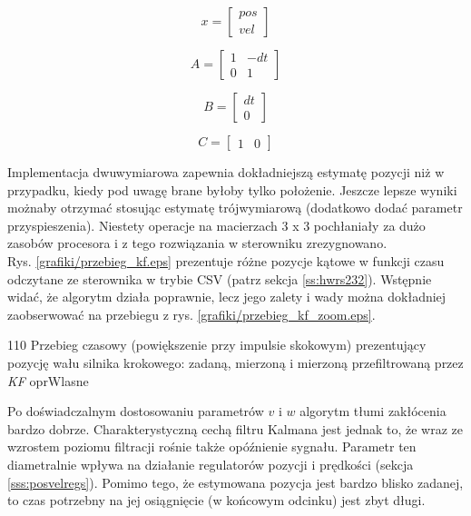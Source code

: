 \begin{equation} \label{eq:alg6}
	x = \begin{bmatrix}
       	pos \\ 
       	vel
     	\end{bmatrix}
\end{equation}

\begin{equation} \label{eq:alg7}
	A = \begin{bmatrix}
       	1 & -dt \\ 
       	0 & 1
     	\end{bmatrix}
\end{equation}

\begin{equation} \label{eq:alg8}
	B = \begin{bmatrix}
       	dt \\ 
       	0
     	\end{bmatrix}
\end{equation}

\begin{equation} \label{eq:alg9}
	C = \begin{bmatrix}
       	1 & 0 
     	\end{bmatrix}
\end{equation}

Implementacja dwuwymiarowa zapewnia dokładniejszą estymatę pozycji niż \linebreak w przypadku, kiedy pod uwagę brane byłoby tylko położenie. Jeszcze lepsze wyniki możnaby otrzymać stosując estymatę trójwymiarową (dodatkowo dodać parametr przyspieszenia). Niestety operacje na macierzach 3 x 3 pochłaniały za dużo zasobów procesora i z tego rozwiązania w sterowniku zrezygnowano. \\

Rys. \ref{grafiki/przebieg_kf.eps} prezentuje różne pozycje kątowe w funkcji czasu odczytane ze sterownika w trybie CSV (patrz sekcja \ref{ss:hwrs232}). Wstępnie widać, że algorytm działa poprawnie, lecz jego zalety i wady można dokładniej zaobserwować na przebiegu z rys. \ref{grafiki/przebieg_kf_zoom.eps}.

	{110}
	{Przebieg czasowy (powiększenie przy impulsie skokowym) prezentujący pozycję wału silnika krokowego: zadaną, mierzoną i mierzoną przefiltrowaną przez {\it KF}}
	{oprWlasne}
	
Po doświadczalnym dostosowaniu parametrów $ v $ i $ w $ algorytm tłumi zakłócenia bardzo dobrze. Charakterystyczną cechą filtru Kalmana jest jednak to, że wraz ze wzrostem poziomu filtracji rośnie także opóźnienie sygnału. Parametr ten diametralnie wpływa na działanie regulatorów pozycji i prędkości (sekcja \ref{sss:posvelregs}). Pomimo tego, że estymowana pozycja jest bardzo blisko zadanej, to czas potrzebny na jej osiągnięcie (w końcowym odcinku) jest zbyt długi. \\

